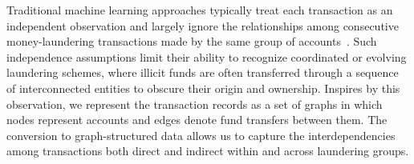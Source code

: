 \documentclass[11pt,english]{article}
\begin{document}
Traditional machine learning approaches typically treat each transaction as an independent observation and largely ignore the relationships among consecutive money-laundering transactions made by the same group of accounts~\parencite{wang2024temporal, amoako2025exploring, pettersson2022combating, alotibi2022money, jensen2023fighting, lokanan2024predicting}. Such independence assumptions limit their ability to recognize coordinated or evolving laundering schemes, where illicit funds are often transferred through a sequence of interconnected entities to obscure their origin and ownership. Inspires by this observation, we represent the transaction records as a set of graphs in which nodes represent accounts and edges denote fund transfers between them. The conversion to graph-structured data allows us to capture the interdependencies among transactions both direct and indirect within and across laundering groups. 
\end{document}
